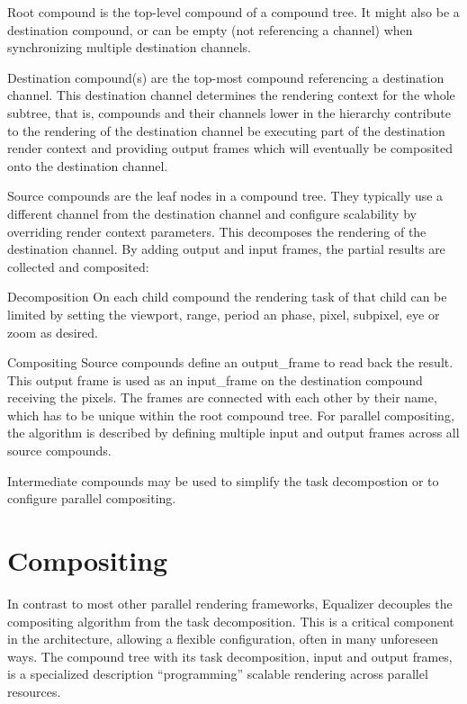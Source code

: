 \begin{compactdesc}
 \item [Root compound] is the top-level compound of a compound tree. It might
 also be a destination compound, or can be empty (not referencing a channel)
 when synchronizing multiple destination channels.
 \item [Destination compound(s)] are the top-most compound referencing a
 destination channel. This destination channel determines the rendering context
 for the whole subtree, that is, compounds and their channels lower in the
 hierarchy contribute to the rendering of the destination channel be executing
 part of the destination render context and providing output frames which will
 eventually be composited onto the destination channel.
 \item [Source compounds] are the leaf nodes in a compound tree. They typically
 use a different channel from the destination channel and configure scalability
 by overriding render context parameters. This decomposes the rendering of the
 destination channel. By adding output and input frames, the partial results are
 collected and composited:
 \begin{compactdesc}
  \item[Decomposition] On each child compound the rendering task of that
  child can be limited by setting the \textsf{viewport}, \textsf{range},
  \textsf{period} an  \textsf{phase}, \textsf{pixel}, \textsf{subpixel},
  \textsf{eye} or \textsf{zoom} as desired.
  \item[Compositing] Source compounds define an \textsf{output\_frame} to read
  back the result. This output frame is used as an \textsf{input\_frame} on the
  destination compound receiving the pixels. The frames are connected with each
  other by their name, which has to be unique within the root compound tree. For
  parallel compositing, the algorithm is described by defining multiple input
  and output frames across all source compounds.
 \end{compactdesc}
 \item[Intermediate compounds] may be used to simplify the task decompostion or
 to configure parallel compositing.
\end{compactdesc}

\section{Compositing}

In contrast to most other parallel rendering frameworks, Equalizer decouples the
compositing algorithm from the task decomposition. This is a critical component
in the architecture, allowing a flexible configuration, often in many unforeseen
ways. The compound tree with its task decomposition, input and output frames, is
a specialized description ``programming'' scalable rendering across parallel
resources.

